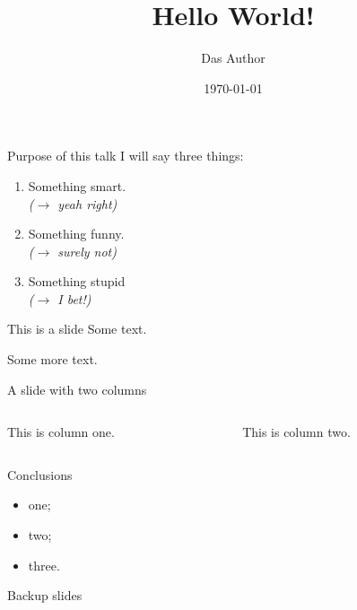 \documentclass[aspectratio=43]{beamer}
\title{Hello World!}
\author{Das Author}
\date{\today}
\begin{document}
 
\begin{frame}[plain]
\titlepage
{}
\begin{center}

\end{center}
\end{frame}
 

\begin{frame}{Purpose of this talk}
    I will say three things:
    \medskip
    \begin{enumerate}
        \item Something smart.\\ \emph{($\rightarrow$ yeah right)}
        \medskip
        \item Something funny.\\ \emph{($\rightarrow$ surely not)}
        \medskip
        \item Something stupid\\ \emph{($\rightarrow$ I bet!)}
    \end{enumerate}
\end{frame}


\begin{frame}{This is a slide}
Some text.\bigskip

Some more text.\bigskip

\end{frame}
 

\begin{frame}[fragile]{A slide with two columns}
    \begin{columns}[<options>]
    \begin{column}{0.45\textwidth}
        This is column one.
    \end{column}
    \begin{column}{0.45\textwidth}
        This is column two.
    \end{column}
    \end{columns}
\end{frame}


\begin{frame}{Conclusions}
    \begin{itemize}
        \item one;
        \item two;
        \item three.
    \end{itemize}
\end{frame}


\begin{frame}{}
\begin{center}
\huge
Backup slides
\end{center}
\end{frame}
\end{document}
